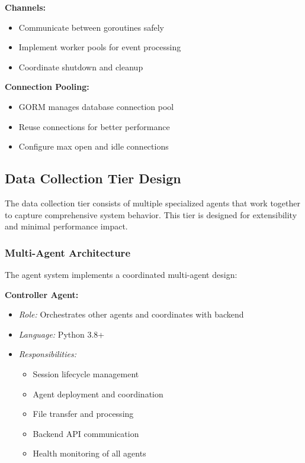 \textbf{Channels:}
\begin{itemize}
    \item Communicate between goroutines safely
    \item Implement worker pools for event processing
    \item Coordinate shutdown and cleanup
\end{itemize}

\textbf{Connection Pooling:}
\begin{itemize}
    \item GORM manages database connection pool
    \item Reuse connections for better performance
    \item Configure max open and idle connections
\end{itemize}

\subsection{Data Collection Tier Design}

The data collection tier consists of multiple specialized agents that work together to capture comprehensive system behavior. This tier is designed for extensibility and minimal performance impact.

\subsubsection{Multi-Agent Architecture}

The agent system implements a coordinated multi-agent design:

\textbf{Controller Agent:}
\begin{itemize}
    \item \textit{Role:} Orchestrates other agents and coordinates with backend
    \item \textit{Language:} Python 3.8+
    \item \textit{Responsibilities:}
    \begin{itemize}
        \item Session lifecycle management
        \item Agent deployment and coordination
        \item File transfer and processing
        \item Backend API communication
        \item Health monitoring of all agents
    \end{itemize}
\end{itemize}

